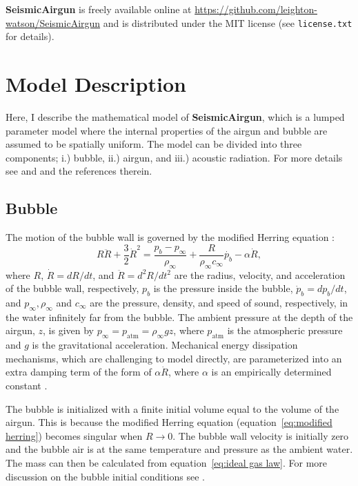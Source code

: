\documentclass[10pt]{article}
\begin{document}
{\bf SeismicAirgun} is freely available online at \href{https://github.com/leighton-watson/SeismicAirgun}{https://github.com/leighton-watson/SeismicAirgun} and is distributed under the MIT license (see \texttt{license.txt} for details). 

\section{Model Description}
Here, I describe the mathematical model of {\bf SeismicAirgun}, which is a lumped parameter model where the internal properties of the airgun and bubble are assumed to be spatially uniform. The model can be divided into three components; i.) bubble, ii.) airgun, and iii.) acoustic radiation. For more details see \citet{Chelminski2019} and \citet{Watson2016} and the references therein. 

\subsection{Bubble}
The motion of the bubble wall is governed by the modified Herring equation \citep{Herring1941,Cole1948,Vokurka1986}:
\begin{equation}
R \ddot{R}+ \frac{3}{2} \dot{R}^2 = \frac{p_b - p_\infty}{\rho_\infty} + \frac{R}{\rho_\infty c_\infty} \dot{p_b} - \alpha \dot{R},
\label{eq:modified herring}
\end{equation}
where $R$, $\dot{R}=dR/dt$, and $\ddot{R}=d^2R/dt^2$ are the radius, velocity, and acceleration of the bubble wall, respectively, $p_b$ is the pressure inside the bubble, $\dot{p}_b = dp_b/dt$, and $p_\infty, \rho_\infty$ and $c_\infty$ are the pressure, density, and speed of sound, respectively, in the water infinitely far from the bubble. The ambient pressure at the depth of the airgun, $z$, is given by $p_\infty = p_\text{atm} = \rho_\infty g z$, where $p_\text{atm}$ is the atmospheric pressure and $g$ is the gravitational acceleration. Mechanical energy dissipation mechanisms, which are challenging to model directly, are parameterized into an extra damping term of the form of $\alpha \dot{R}$, where $\alpha$ is an empirically determined constant \cite{Langhammer1996,Watson2017_airgun}.

The bubble is initialized with a finite initial volume equal to the volume of the airgun. This is because the modified Herring equation (equation~\ref{eq:modified herring}) becomes singular when $R\rightarrow0$. The bubble wall velocity is initially zero and the bubble air is at the same temperature and pressure as the ambient water. The mass can then be calculated from equation~\ref{eq:ideal gas law}. For more discussion on the bubble initial conditions see \citet{Watson2019_airgun}.
\end{document}
